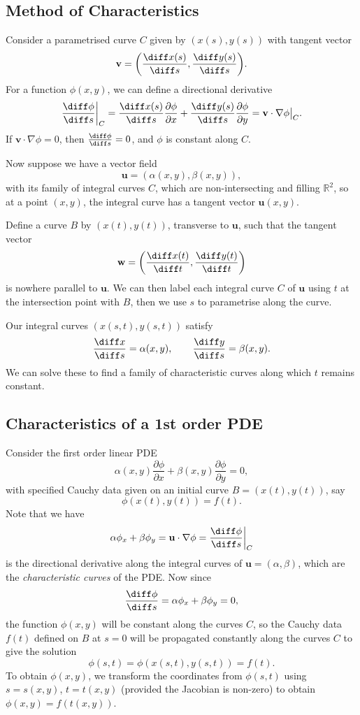 \documentclass[12pt]{article}
\begin{document}
\subsection{Method of Characteristics}%
\label{sub:method_of_characteristics}

Consider a parametrised curve $C$ given by $(x(s), y(s))$ with tangent vector
\[
	\mathbf{v} = \biggl( \frac{\diff x(s)}{\diff s}, \frac{\diff y(s)}{\diff s} \biggr)
.\]
For a function $\phi(x, y)$, we can define a directional derivative
\[
	\frac{\diff \phi}{\diff s} \biggr|_{C} = \frac{\diff x(s)}{\diff s} \frac{\partial \phi}{\partial x} + \frac{\diff y(s)}{\diff s} \frac{\partial \phi}{\partial y} = \mathbf{v} \cdot \nabla \phi \bigr|_{C}
.\]
If $\mathbf{v} \cdot \nabla \phi = 0$, then $\frac{\diff \phi}{\diff s} = 0$, and $\phi$ is constant along $C$.

Now suppose we have a vector field
\[
	\mathbf{u}= (\alpha(x, y), \beta(x, y))
,\]
with its family of integral curves $C$, which are non-intersecting and filling $\mathbb{R}^2$, so at a point $(x, y)$, the integral curve has a tangent vector $\mathbf{u}(x, y)$.

Define a curve $B$ by $(x(t), y(t))$, transverse to $\mathbf{u}$, such that the tangent vector
\[
	\mathbf{w} = \biggl( \frac{\diff x(t)}{\diff t}, \frac{\diff y(t)}{\diff t} \biggr)
\]
is nowhere parallel to $\mathbf{u}$. We can then label each integral curve $C$ of $\mathbf{u}$ using $t$ at the intersection point with $B$, then we use $s$ to parametrise along the curve.

Our integral curves $(x(s, t), y(s, t))$ satisfy
\[
	\frac{\diff x}{\diff s} = \alpha(x, y), \qquad \frac{\diff y}{\diff s} = \beta(x, y)
.\]
We can solve these to find a family of characteristic curves along which $t$ remains constant.

\subsection{Characteristics of a 1st order PDE}%
\label{sub:characteristics_of_a_1st_order_pde}

Consider the first order linear PDE
\[
	\alpha(x, y) \frac{\partial \phi}{\partial x} + \beta(x, y) \frac{\partial \phi}{\partial y} = 0
,\]
with specified Cauchy data given on an initial curve $B = (x(t), y(t))$, say
\[
	\phi(x(t), y(t)) = f(t)
.\]
Note that we have
\[
\alpha \phi_x + \beta \phi_y = \mathbf{u} \cdot \nabla \phi = \frac{\diff \phi}{\diff s} \biggr|_{C}
\]
is the directional derivative along the integral curves of $\mathbf{u} = (\alpha, \beta)$, which are the \textit{characteristic curves} of the PDE. Now since
\[
\frac{\diff \phi}{\diff s} = \alpha \phi_x + \beta \phi_y = 0
,\]
the function $\phi(x, y)$ will be constant along the curves $C$, so the Cauchy data $f(t)$ defined on $B$ at $s = 0$ will be propagated constantly along the curves $C$ to give the solution
\[
	\phi(s, t) = \phi(x(s, t), y(s, t)) = f(t)
.\]
To obtain $\phi(x, y)$, we transform the coordinates from  $\phi(s, t)$ using $s = s(x, y)$, $t = t(x, y)$ (provided the Jacobian is non-zero) to obtain $\phi(x, y) = f(t(x, y))$.
\end{document}
